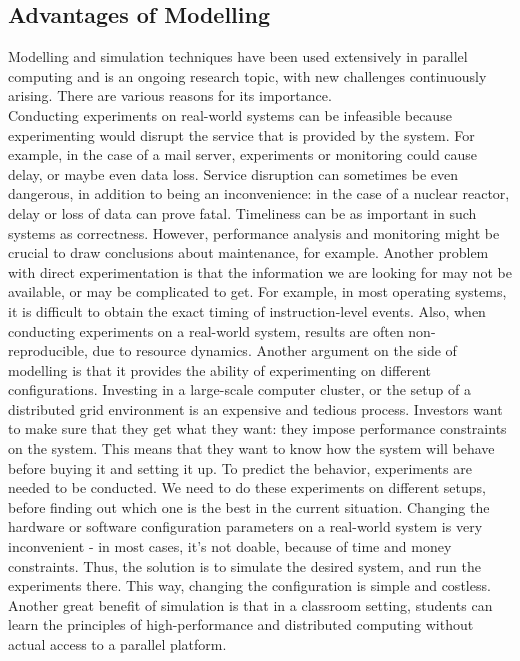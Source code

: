 \subsection{Advantages of Modelling}
Modelling and simulation techniques have been used extensively in
parallel computing and is an ongoing research topic, with new
challenges continuously arising. There are various reasons for its
importance.\\
Conducting experiments on real-world systems can be
infeasible because experimenting would disrupt the service that is
provided by the system. For example, in the case of a mail server,
experiments or monitoring could cause delay, or maybe even data
loss. Service disruption can sometimes be even dangerous, in addition
to being an inconvenience: in the case of a nuclear reactor, delay or
loss of data can prove fatal. Timeliness can be as important in such
systems as correctness. However, performance analysis and monitoring
might be crucial to draw conclusions about maintenance, for
example. Another problem with direct experimentation is that the
information we are looking for may not be available, or may be
complicated to get. For example, in most operating systems, it is
difficult to obtain the exact timing of instruction-level
events.\cite{h12_1} Also, when conducting experiments on a real-world
system, results are often non-reproducible, due to resource
dynamics.\cite{clq08} Another argument on the side of modelling is
that it provides the ability of experimenting on different
configurations. Investing in a large-scale computer cluster, or the
setup of a distributed grid environment is an expensive and tedious
process. Investors want to make sure that they get what they
want: they impose performance constraints on the system. This means
that they want to know how the system will behave
before buying it and setting it up. To predict the behavior,
experiments are needed to be conducted. We need to do these
experiments on different setups, before finding out which one is the
best in the current situation. Changing the hardware or software
configuration parameters on a real-world system is very inconvenient -
in most cases, it's not doable, because of time and money
constraints. Thus, the solution is to simulate the desired
system, and run the experiments there. This way, changing the
configuration is simple and costless.\cite{h12_1} Another great
benefit of simulation is that in a classroom setting, students can
learn the principles of high-performance and distributed computing
without actual access to a parallel platform.\cite{csgscq11}
